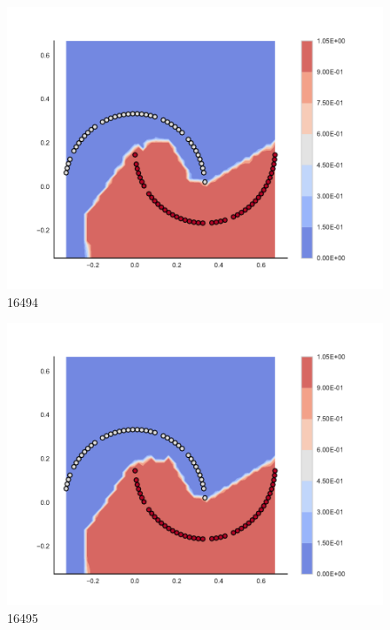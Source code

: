 \begin{subfigure}[b]{0.09\textwidth}
    \includegraphics[clip, trim=2.35cm 1.75cm 4.5cm 0cm,width=\textwidth]{img/convergence/16494.pdf}
    \caption{16494}
    \label{fig:convergence_16494}
\end{subfigure}
%
\begin{subfigure}[b]{0.09\textwidth}
    \includegraphics[clip, trim=2.35cm 1.75cm 4.5cm 0cm,width=\textwidth]{img/convergence/16495.pdf}
    \caption{16495}
    \label{fig:convergence_16495}
\end{subfigure}
%
